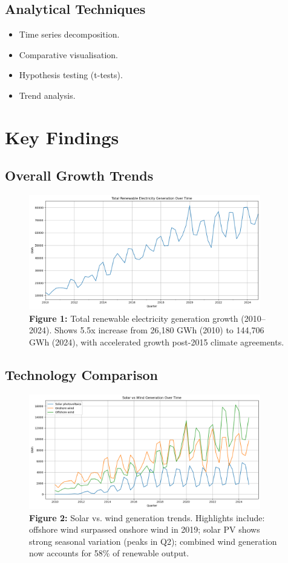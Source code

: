 \documentclass[11pt]{article}
\begin{document}
\subsection{Analytical Techniques}
\begin{itemize}
  \item Time series decomposition.
  \item Comparative visualisation.
  \item Hypothesis testing (t-tests).
  \item Trend analysis.
\end{itemize}

\section{Key Findings}
\subsection{Overall Growth Trends}
\begin{figure}[ht]
  \centering
  \includegraphics[width=0.9\textwidth]{output_13_0.png}
  \caption*{\textbf{Figure 1:} Total renewable electricity generation growth (2010--2024). Shows 5.5x increase from 26,180 GWh (2010) to 144,706 GWh (2024), with accelerated growth post-2015 climate agreements.}
\end{figure}

\subsection{Technology Comparison}
\begin{figure}[ht]
  \centering
  \includegraphics[width=0.9\textwidth]{output_14_0.png}
  \caption*{\textbf{Figure 2:} Solar vs. wind generation trends. Highlights include: offshore wind surpassed onshore wind in 2019; solar PV shows strong seasonal variation (peaks in Q2); combined wind generation now accounts for 58\% of renewable output.}
\end{figure}
\end{document}
